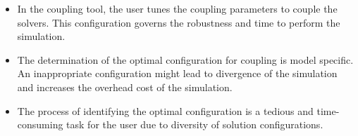 \documentclass[20pt, 
               a4paper, 
               portraitmargin = 0mm, 
               margin = 0mm,
               innermargin = 50mm,
               blockverticalspace = 10mm,
               colspace = 40mm,
               subcolspace = 8mm]
               {tikzposter}
\begin{document}
\begin{columns}
	{
	\begin{itemize}[noitemsep,topsep=0pt]
	    \item In the coupling tool, the user tunes the coupling parameters to couple the solvers. This configuration governs the robustness and time to perform the simulation.
	    \item The determination of the optimal configuration for coupling is model specific. An inappropriate configuration might lead to divergence of the simulation and increases the overhead cost of the simulation.
	    \item The process of identifying the optimal configuration is a tedious and time-consuming task for the user due to diversity of solution configurations.
	\end{itemize}    
    }


    

\end{columns}
\end{document}

